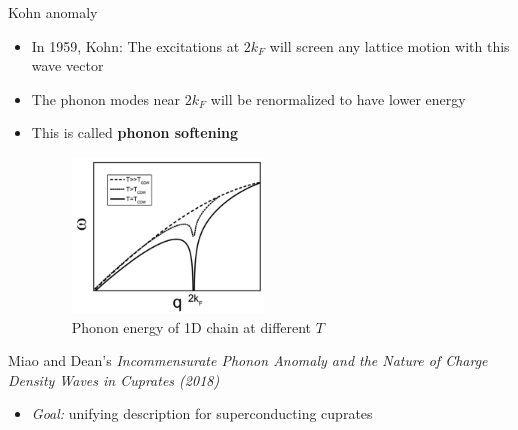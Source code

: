 \documentclass{beamer}
\begin{document}
\begin{frame}{Kohn anomaly}
\begin{itemize}
\item In 1959, Kohn: The excitations at $2 k_F$ will screen any lattice motion with this wave vector
\item The phonon modes near $2 k_F$ will be renormalized to have lower energy
\item This is called \textbf{phonon softening}
\begin{figure}
\includegraphics[width=2in]{figs/kohn_anomaly.png}
\caption{\label{fig:kohn_anomaly} Phonon energy of 1D chain at different $T$}
\end{figure}
\end{itemize}
\end{frame}

\begin{frame}{Miao and Dean's \textit{Incommensurate Phonon Anomaly and the Nature of Charge Density Waves in Cuprates (2018)}}
\begin{itemize}
\item \textit{Goal:} unifying description for superconducting cuprates
\end{itemize}
\end{frame}
\end{document}

